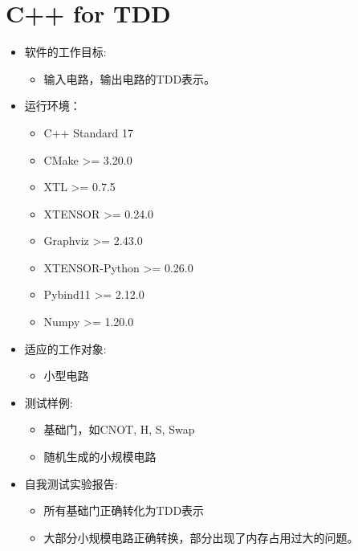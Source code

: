 \documentclass{article}
\begin{document}
\section{C++ for TDD}
\begin{itemize}[leftmargin=*]
    \item 软件的工作目标: 
    \begin{itemize}
        \item 输入电路，输出电路的TDD表示。
    \end{itemize}
    \item 运行环境： 
    \begin{itemize}
        \item C++ Standard 17
        \item CMake >= 3.20.0
        \item XTL >= 0.7.5
        \item XTENSOR >= 0.24.0
        \item Graphviz >= 2.43.0
        \item XTENSOR-Python >= 0.26.0
        \item Pybind11 >= 2.12.0
        \item Numpy >= 1.20.0
    \end{itemize} 
    \item 适应的工作对象:
    \begin{itemize}
        \item 小型电路
    \end{itemize}
    \item 测试样例:
    \begin{itemize}
        \item 基础门，如CNOT, H, S, Swap
        \item 随机生成的小规模电路
    \end{itemize}
    \item 自我测试实验报告:
    \begin{itemize}
        \item 所有基础门正确转化为TDD表示
        \item 大部分小规模电路正确转换，部分出现了内存占用过大的问题。
    \end{itemize}
\end{itemize}
\end{document}

